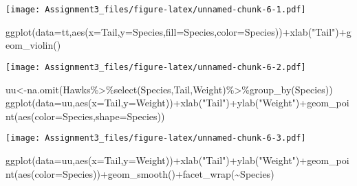 \documentclass[
]{article}
\newenvironment{Shaded}{\begin{snugshade}}{\end{snugshade}}
\newcommand{\AttributeTok}[1]{\textcolor[rgb]{0.77,0.63,0.00}{#1}}
\newcommand{\FunctionTok}[1]{\textcolor[rgb]{0.00,0.00,0.00}{#1}}
\newcommand{\NormalTok}[1]{#1}
\newcommand{\OtherTok}[1]{\textcolor[rgb]{0.56,0.35,0.01}{#1}}
\newcommand{\SpecialCharTok}[1]{\textcolor[rgb]{0.00,0.00,0.00}{#1}}
\newcommand{\StringTok}[1]{\textcolor[rgb]{0.31,0.60,0.02}{#1}}
\begin{document}
\texttt{[image: Assignment3\_files/figure-latex/unnamed-chunk-6-1.pdf]}

\begin{Shaded}
\begin{Highlighting}[]
\FunctionTok{ggplot}\NormalTok{(}\AttributeTok{data=}\NormalTok{tt,}\FunctionTok{aes}\NormalTok{(}\AttributeTok{x=}\NormalTok{Tail,}\AttributeTok{y=}\NormalTok{Species,}\AttributeTok{fill=}\NormalTok{Species,}\AttributeTok{color=}\NormalTok{Species))}\SpecialCharTok{+}\FunctionTok{xlab}\NormalTok{(}\StringTok{"Tail"}\NormalTok{)}\SpecialCharTok{+}\FunctionTok{geom\_violin}\NormalTok{()}
\end{Highlighting}
\end{Shaded}

\texttt{[image: Assignment3\_files/figure-latex/unnamed-chunk-6-2.pdf]}

\begin{Shaded}
\begin{Highlighting}[]
\NormalTok{uu}\OtherTok{\textless{}{-}}\FunctionTok{na.omit}\NormalTok{(Hawks}\SpecialCharTok{\%\textgreater{}\%}\FunctionTok{select}\NormalTok{(Species,Tail,Weight)}\SpecialCharTok{\%\textgreater{}\%}\FunctionTok{group\_by}\NormalTok{(Species))}
\FunctionTok{ggplot}\NormalTok{(}\AttributeTok{data=}\NormalTok{uu,}\FunctionTok{aes}\NormalTok{(}\AttributeTok{x=}\NormalTok{Tail,}\AttributeTok{y=}\NormalTok{Weight))}\SpecialCharTok{+}\FunctionTok{xlab}\NormalTok{(}\StringTok{"Tail"}\NormalTok{)}\SpecialCharTok{+}\FunctionTok{ylab}\NormalTok{(}\StringTok{"Weight"}\NormalTok{)}\SpecialCharTok{+}\FunctionTok{geom\_point}\NormalTok{(}\FunctionTok{aes}\NormalTok{(}\AttributeTok{color=}\NormalTok{Species,}\AttributeTok{shape=}\NormalTok{Species))}
\end{Highlighting}
\end{Shaded}

\texttt{[image: Assignment3\_files/figure-latex/unnamed-chunk-6-3.pdf]}

\begin{Shaded}
\begin{Highlighting}[]
\FunctionTok{ggplot}\NormalTok{(}\AttributeTok{data=}\NormalTok{uu,}\FunctionTok{aes}\NormalTok{(}\AttributeTok{x=}\NormalTok{Tail,}\AttributeTok{y=}\NormalTok{Weight))}\SpecialCharTok{+}\FunctionTok{xlab}\NormalTok{(}\StringTok{"Tail"}\NormalTok{)}\SpecialCharTok{+}\FunctionTok{ylab}\NormalTok{(}\StringTok{"Weight"}\NormalTok{)}\SpecialCharTok{+}\FunctionTok{geom\_point}\NormalTok{(}\FunctionTok{aes}\NormalTok{(}\AttributeTok{color=}\NormalTok{Species))}\SpecialCharTok{+}\FunctionTok{geom\_smooth}\NormalTok{()}\SpecialCharTok{+}\FunctionTok{facet\_wrap}\NormalTok{(}\SpecialCharTok{\textasciitilde{}}\NormalTok{Species)}
\end{Highlighting}
\end{Shaded}
\end{document}

